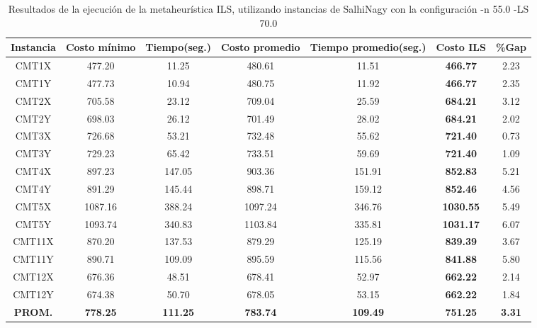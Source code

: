 \begin{table}[ht]
\caption{Resultados de la ejecución de la metaheurística ILS, utilizando instancias de SalhiNagy con la configuración -n 55.0 -LS 70.0}
\centering
\small
\begin{tabular}{c c c c c c c}
\hline\hline
Instancia & Costo mínimo & Tiempo(seg.) & Costo promedio & Tiempo promedio(seg.) & Costo ILS & \%Gap \\ [0.5ex]
\hline
CMT1X & 477.20 & 11.25 & 
480.61 & 11.51 & \bf{466.77} & 
2.23\\CMT1Y & 477.73 & 10.94 & 
480.75 & 11.92 & \bf{466.77} & 
2.35\\CMT2X & 705.58 & 23.12 & 
709.04 & 25.59 & \bf{684.21} & 
3.12\\CMT2Y & 698.03 & 26.12 & 
701.49 & 28.02 & \bf{684.21} & 
2.02\\CMT3X & 726.68 & 53.21 & 
732.48 & 55.62 & \bf{721.40} & 
0.73\\CMT3Y & 729.23 & 65.42 & 
733.51 & 59.69 & \bf{721.40} & 
1.09\\CMT4X & 897.23 & 147.05 & 
903.36 & 151.91 & \bf{852.83} & 
5.21\\CMT4Y & 891.29 & 145.44 & 
898.71 & 159.12 & \bf{852.46} & 
4.56\\CMT5X & 1087.16 & 388.24 & 
1097.24 & 346.76 & \bf{1030.55} & 
5.49\\CMT5Y & 1093.74 & 340.83 & 
1103.84 & 335.81 & \bf{1031.17} & 
6.07\\CMT11X & 870.20 & 137.53 & 
879.29 & 125.19 & \bf{839.39} & 
3.67\\CMT11Y & 890.71 & 109.09 & 
895.59 & 115.56 & \bf{841.88} & 
5.80\\CMT12X & 676.36 & 48.51 & 
678.41 & 52.97 & \bf{662.22} & 
2.14\\CMT12Y & 674.38 & 50.70 & 
678.05 & 53.15 & \bf{662.22} & 
1.84\\\bf{PROM.} & 
\bf{778.25} & \bf{111.25} & \bf{783.74} & \bf{109.49} & \bf{751.25} & \bf{3.31}\\[1ex]\hline
\end{tabular}
\label{table:nonlin}
\end{table} \clearpage
